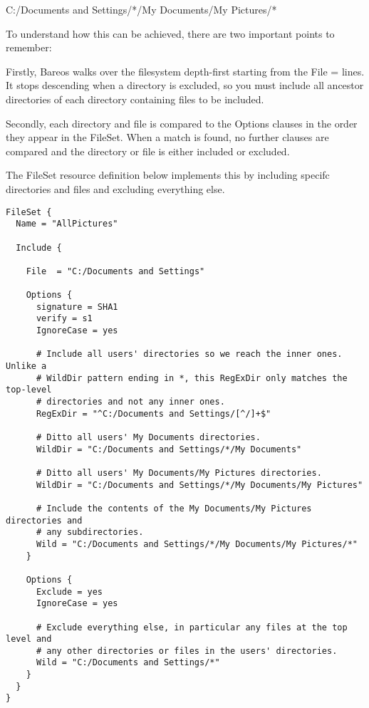 C:/Documents and Settings/*/My Documents/My Pictures/*

To understand how this can be achieved, there are two important points to
remember:

Firstly, Bareos walks over the filesystem depth-first starting from the File =
lines.  It stops descending when a directory is excluded, so you must include
all ancestor directories of each directory containing files to be included.

Secondly, each directory and file is compared to the Options clauses in the
order they appear in the FileSet.  When a match is found, no further clauses
are compared and the directory or file is either included or excluded.

The FileSet resource definition below implements this by including specifc
directories and files and excluding everything else.

\footnotesize
\begin{verbatim}
FileSet {
  Name = "AllPictures"

  Include {

    File  = "C:/Documents and Settings"

    Options {
      signature = SHA1
      verify = s1
      IgnoreCase = yes

      # Include all users' directories so we reach the inner ones.  Unlike a
      # WildDir pattern ending in *, this RegExDir only matches the top-level
      # directories and not any inner ones.
      RegExDir = "^C:/Documents and Settings/[^/]+$"

      # Ditto all users' My Documents directories.
      WildDir = "C:/Documents and Settings/*/My Documents"

      # Ditto all users' My Documents/My Pictures directories.
      WildDir = "C:/Documents and Settings/*/My Documents/My Pictures"

      # Include the contents of the My Documents/My Pictures directories and
      # any subdirectories.
      Wild = "C:/Documents and Settings/*/My Documents/My Pictures/*"
    }

    Options {
      Exclude = yes
      IgnoreCase = yes

      # Exclude everything else, in particular any files at the top level and
      # any other directories or files in the users' directories.
      Wild = "C:/Documents and Settings/*"
    }
  }
}
\end{verbatim}
\normalsize




